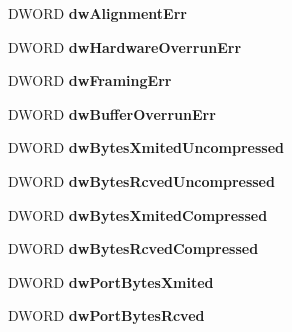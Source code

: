\begin{DoxyCompactItemize}
D\+W\+O\+RD {\bfseries dw\+Alignment\+Err}
\item 
\mbox{\label{struct___r_a_s___p_o_r_t___s_t_a_t_i_s_t_i_c_s_a9ff5ab397430c842ae4137cf586dfe3e}} 
D\+W\+O\+RD {\bfseries dw\+Hardware\+Overrun\+Err}
\item 
\mbox{\label{struct___r_a_s___p_o_r_t___s_t_a_t_i_s_t_i_c_s_aa1539ddda1cf2dc99385185f5c76318c}} 
D\+W\+O\+RD {\bfseries dw\+Framing\+Err}
\item 
\mbox{\label{struct___r_a_s___p_o_r_t___s_t_a_t_i_s_t_i_c_s_a722d910431572c15a83dd19e4b9daafa}} 
D\+W\+O\+RD {\bfseries dw\+Buffer\+Overrun\+Err}
\item 
\mbox{\label{struct___r_a_s___p_o_r_t___s_t_a_t_i_s_t_i_c_s_a645f8b544651f86cf69e67b935a09439}} 
D\+W\+O\+RD {\bfseries dw\+Bytes\+Xmited\+Uncompressed}
\item 
\mbox{\label{struct___r_a_s___p_o_r_t___s_t_a_t_i_s_t_i_c_s_a7d30e8c13712db27a08bb36fa3be6dd0}} 
D\+W\+O\+RD {\bfseries dw\+Bytes\+Rcved\+Uncompressed}
\item 
\mbox{\label{struct___r_a_s___p_o_r_t___s_t_a_t_i_s_t_i_c_s_abd63653ce86b9cb3ef7fd4a4832ec35c}} 
D\+W\+O\+RD {\bfseries dw\+Bytes\+Xmited\+Compressed}
\item 
\mbox{\label{struct___r_a_s___p_o_r_t___s_t_a_t_i_s_t_i_c_s_a4d6466c862f25f8010d7d4ac7a113edd}} 
D\+W\+O\+RD {\bfseries dw\+Bytes\+Rcved\+Compressed}
\item 
\mbox{\label{struct___r_a_s___p_o_r_t___s_t_a_t_i_s_t_i_c_s_aa85498d9849eaa23c776429efff974ee}} 
D\+W\+O\+RD {\bfseries dw\+Port\+Bytes\+Xmited}
\item 
\mbox{\label{struct___r_a_s___p_o_r_t___s_t_a_t_i_s_t_i_c_s_ae436527e4a9be8fd773d80ed288c8305}} 
D\+W\+O\+RD {\bfseries dw\+Port\+Bytes\+Rcved}

\end{DoxyCompactItemize}
